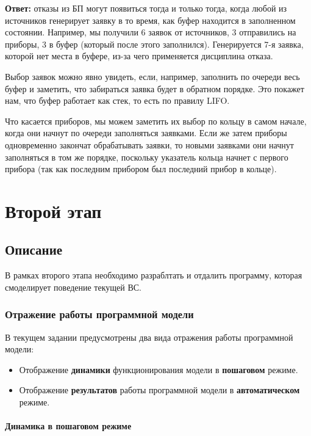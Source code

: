 \documentclass[a4paper, 14pt]{article}
\begin{document}
\begin{enumerate}
	      \textbf{Ответ:} отказы из БП могут появиться тогда и только тогда, когда любой из источников генерирует заявку в то время, как буфер находится в заполненном состоянии. Например, мы получили 6 заявок от источников, 3 отправились на приборы, 3 в буфер (который после этого заполнился). Генерируется 7-я заявка, которой нет места в буфере, из-за чего применяется дисциплина отказа.

	      Выбор заявок можно явно увидеть, если, например, заполнить по очереди весь буфер и заметить, что забираться заявка будет в обратном порядке. Это покажет нам, что буфер работает как стек, то есть по правилу LIFO.

	      Что касается приборов, мы можем заметить их выбор по кольцу в самом начале, когда они начнут по очереди заполняться заявками. Если же затем приборы одновременно закончат обрабатывать заявки, то новыми заявками они начнут заполняться в том же порядке, поскольку указатель кольца начнет с первого прибора (так как последним прибором был последний прибор в кольце).
\end{enumerate}

\section{Второй этап}

\subsection{Описание}

В рамках второго этапа необходимо разраблтать и отдалить программу, которая смоделирует поведение текущей ВС.



\subsubsection{Отражение работы программной модели}

В текущем задании предусмотрены два вида отражения работы программной модели:
\begin{itemize}
	\item Отображение \textbf{динамики} функционирования модели в \textbf{пошаговом} режиме.
	\item Отображение \textbf{результатов} работы программной модели в \textbf{автоматическом} режиме.
\end{itemize}

\paragraph{Динамика в пошаговом режиме}
\end{document}
